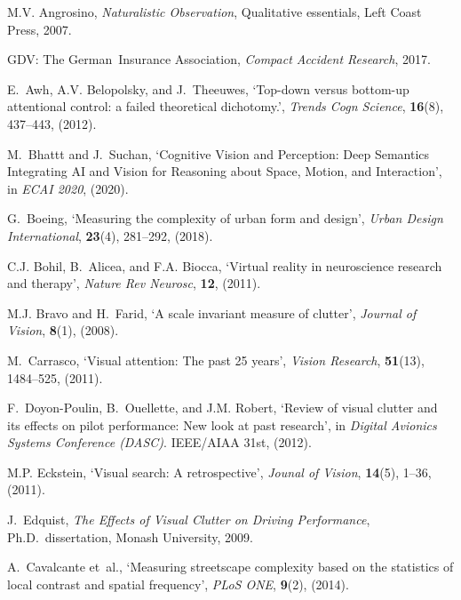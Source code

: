 \documentclass[a4paper]{article}
\begin{document}
\footnotesize
\linespread{0.9}

%



\begin{thebibliography}{10}

M.V. Angrosino, {\em Naturalistic Observation}, Qualitative essentials, Left
  Coast Press, 2007.

GDV: The German~Insurance Association, {\em Compact Accident Research}, 2017.

E.~Awh, A.V. Belopolsky, and J.~Theeuwes, `Top-down versus bottom-up
  attentional control: a failed theoretical dichotomy.', {\em Trends Cogn
  Science}, {\bf 16}(8),  437--443, (2012).

M.~Bhattt and J.~Suchan, `{Cognitive Vision and Perception: Deep Semantics
  Integrating AI and Vision for Reasoning about Space, Motion, and
  Interaction}', in {\em ECAI 2020}, (2020).

G.~Boeing, `Measuring the complexity of urban form and design', {\em Urban
  Design International}, {\bf 23}(4),  281--292, (2018).

C.J. Bohil, B.~Alicea, and F.A. Biocca, `Virtual reality in neuroscience
  research and therapy', {\em Nature Rev Neurosc}, {\bf 12}, (2011).

M.J. Bravo and H.~Farid, `A scale invariant measure of clutter', {\em Journal
  of Vision}, {\bf 8}(1), (2008).

M.~Carrasco, `Visual attention: The past 25 years', {\em Vision Research}, {\bf
  51}(13),  1484--525, (2011).

F.~Doyon-Poulin, B.~Ouellette, and J.M. Robert, `Review of visual clutter and
  its effects on pilot performance: New look at past research', in {\em Digital
  Avionics Systems Conference (DASC)}. IEEE/AIAA 31st, (2012).

M.P. Eckstein, `Visual search: A retrospective', {\em Jounal of Vision}, {\bf
  14}(5),  1--36, (2011).

J.~Edquist, {\em The Effects of Visual Clutter on Driving Performance}, Ph.D.\
  dissertation, Monash University, 2009.

A.~Cavalcante et~al., `Measuring streetscape complexity based on the statistics
  of local contrast and spatial frequency', {\em PLoS ONE}, {\bf 9}(2), (2014).


\end{thebibliography}
\end{document}
